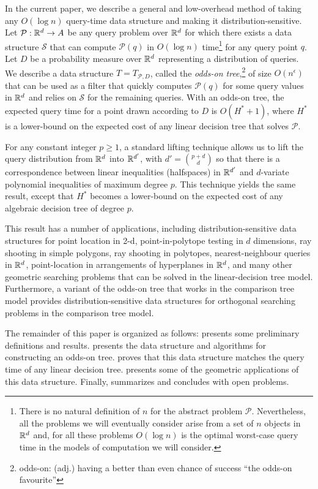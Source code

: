 \documentclass{patmorin}
\newcommand{\eps}{\epsilon}
\begin{document}
In the current paper, we describe a general and low-overhead method
of taking any $O(\log n)$ query-time data structure and making it
distribution-sensitive.  Let $\mathcal{P}:\mathbb{R}^d\rightarrow A$ be any query
problem over $\mathbb{R}^d$ for which there exists a data structure $\mathcal{S}$
that can compute $\mathcal{P}(q)$ in $O(\log n)$ time\footnote{There
is no natural definition of $n$ for the abstract problem $\mathcal{P}$.
Nevertheless, all the problems we will eventually consider arise from a
set of $n$ objects in $\mathbb{R}^d$ and, for all these problems $O(\log n)$ is
the optimal worst-case query time in the models of computation we will
consider.} for any query point $q$.  Let $D$ be a probability measure
over $\mathbb{R}^d$ representing a distribution of queries.  We describe
a data structure $T=T_{\mathcal{P},D}$, called the \emph{odds-on
tree},\footnote{odds-on: (adj.) having a better than even chance of
success ``the odds-on favourite''}  of size $O(n^\eps)$ that can be
used as a filter that quickly computes $\mathcal{P}(q)$ for some query
values in $\mathbb{R}^d$ and relies on $\mathcal{S}$ for the remaining queries.
With an odds-on tree, the expected query time for a point drawn according
to $D$ is $O(H^*+1)$, where $H^*$ is a lower-bound on the expected cost
of any linear decision tree that solves $\mathcal{P}$.

For any constant integer $p\ge 1$, a standard lifting technique allows us
to lift the query distribution from $\mathbb{R}^d$ into $\mathbb{R}^{d'}$, with $d'={p+d
\choose d}$ so that there is a correspondence between linear inequalities
(halfspaces) in $\mathbb{R}^{d'}$ and $d$-variate polynomial inequalities of
maximum degree $p$.  This technique yields the same result, except that
$H^*$ becomes a lower-bound on the expected cost of any algebraic decision
tree of degree $p$.

This result has a number of applications, including distribution-sensitive
data structures for point location in 2-d, point-in-polytope testing
in $d$ dimensions, ray shooting in simple polygons, ray shooting
in polytopes, nearest-neighbour queries in $\mathbb{R}^d$, point-location
in arrangements of hyperplanes in $\mathbb{R}^d$, and many other geometric
searching problems that can be solved in the linear-decision tree model.
Furthermore, a variant of the odds-on tree that works in the comparison
tree model provides distribution-sensitive data structures for orthogonal
searching problems in the comparison tree model.

The remainder of this paper is organized as follows: 
presents some preliminary definitions and results. 
presents the data structure and algorithms for constructing an odds-on
tree.   proves that this data structure matches the
query time of any linear decision tree.   presents
some of the geometric applications of this data structure. Finally,
 summarizes and concludes with open problems.
\end{document}
